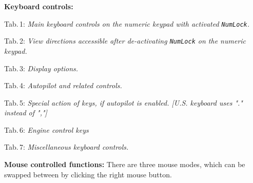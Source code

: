 \documentclass[10pt]{article}
\begin{document}
 \noindent
 \textbf{Keyboard controls:}
\begin{multicols}{2}
 \noindent
 Tab.\,1: \textit{Main keyboard controls on the numeric keypad with
 activated \texttt{NumLock}.}\\

\noindent

\bigskip

 \noindent
 Tab.\,2: \textit{View directions accessible after de-activating \texttt{NumLock} on the numeric keypad.}
\medskip

 \noindent
 
\bigskip

 \noindent
 Tab.\,3: \textit{Display options.}
\medskip

 \noindent

\bigskip
\rule{0mm}{15mm}


\medskip

 \noindent
 Tab.\,4: \textit{Autopilot and related controls.}
\medskip

\noindent

\medskip

 \noindent
Tab.\,5: \textit{Special action of keys, if autopilot is enabled.
[U.S. keyboard uses "." instead of ","]}
\medskip

 \noindent

\medskip


 \noindent
Tab.\,6: \textit{Engine control keys}
\medskip

 \noindent

\medskip

 \noindent
Tab.\,7: \textit{Miscellaneous keyboard controls.}
\medskip

 \noindent

\medskip


\end{multicols}

 \noindent
 \textbf{Mouse controlled functions:}
 There are three mouse modes, which can be swapped between by clicking the right mouse button.
\end{document}
